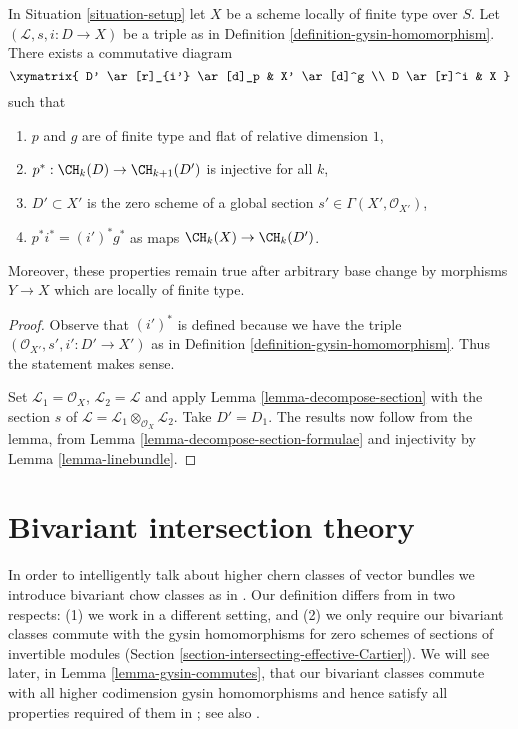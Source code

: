 \begin{lemma}
\label{lemma-normal-cone-effective-Cartier}
In Situation \ref{situation-setup} let $X$ be a scheme locally
of finite type over $S$. Let $(\mathcal{L}, s, i : D \to X)$
be a triple as in Definition \ref{definition-gysin-homomorphism}.
There exists a commutative diagram
$$
\xymatrix{
D' \ar[r]_{i'} \ar[d]_p & X' \ar[d]^g \\
D \ar[r]^i & X
}
$$
such that
\begin{enumerate}
\item $p$ and $g$ are of finite type and flat of relative dimension $1$,
\item $p^* : \CH_k(D) \to \CH_{k + 1}(D')$ is injective for all $k$,
\item $D' \subset X'$ is the zero scheme of a global section
$s' \in \Gamma(X', \mathcal{O}_{X'})$,
\item $p^*i^* = (i')^*g^*$ as maps $\CH_k(X) \to \CH_k(D')$.
\end{enumerate}
Moreover, these properties remain true after arbitrary base change
by morphisms $Y \to X$ which are locally of finite type.
\end{lemma}

\begin{proof}
Observe that $(i')^*$ is defined because we have the triple
$(\mathcal{O}_{X'}, s', i' : D' \to X')$ as in
Definition \ref{definition-gysin-homomorphism}. Thus the statement makes sense.

\medskip\noindent
Set $\mathcal{L}_1 = \mathcal{O}_X$, $\mathcal{L}_2 = \mathcal{L}$
and apply Lemma \ref{lemma-decompose-section} with the section $s$ of
$\mathcal{L} = \mathcal{L}_1 \otimes_{\mathcal{O}_X} \mathcal{L}_2$.
Take $D' = D_1$. The results now follow from the lemma, from
Lemma \ref{lemma-decompose-section-formulae}
and injectivity by
Lemma \ref{lemma-linebundle}.
\end{proof}











\section{Bivariant intersection theory}
\label{section-bivariant}

\noindent
In order to intelligently talk about higher chern classes of vector
bundles we introduce bivariant chow classes as in \cite{F}.
Our definition differs from \cite{F} in two respects:
(1) we work in a different setting, and (2) we only require
our bivariant classes commute with the gysin homomorphisms for
zero schemes of sections of invertible modules
(Section \ref{section-intersecting-effective-Cartier}).
We will see later, in Lemma \ref{lemma-gysin-commutes}, that our
bivariant classes commute with all higher codimension gysin homomorphisms
and hence satisfy all properties required of them in \cite{F}; see
also \cite[Theorem 17.1]{F}.

